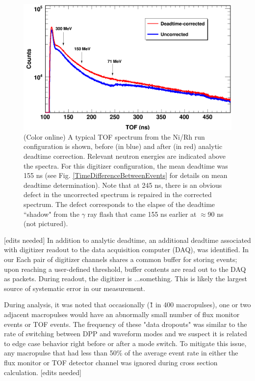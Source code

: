 \documentclass[twocolumn,secnumarabic,amssymb, nobibnotes, aps, prl,
superscriptaddress, nobalancelastpage]{revtex4}
\begin{document}
\begin{figure}
    \includegraphics[scale=0.3]{figures/CorrectionEffectOnTOF.png}
    \caption{(Color online) A typical TOF spectrum from the Ni/Rh
        run configuration is shown, before (in blue) and after (in red) analytic
        deadtime correction. Relevant neutron energies are indicated above the spectra.
        For this digitizer configuration, the mean deadtime was 155 ns (see Fig.
        \ref{TimeDifferenceBetweenEvents} for details on mean deadtime determination).
        Note that at 245 ns, there is an
        obvious defect in the uncorrected spectrum is repaired in the corrected
        spectrum. The defect
        corresponds to the elapse of the deadtime ``shadow" from the $\gamma$
        ray flash that came 155 ns earlier at $\approx$90 ns (not pictured).
    }
    \label{CorrectionEffectOnTOF}
\end{figure}

[edits needed]
In addition to analytic deadtime, an additional deadtime associated with digitizer readout 
to the data acquisition computer (DAQ), was identified. In our Each pair of
digitizer channels shares a common buffer for storing events; upon reaching a
user-defined threshold, buffer contents are read out to the DAQ as packets.
During readout, the digitizer is ...something.
This is likely the largest source of systematic error in our measurement.

During analysis, it was noted that occasionally (\~1 in 400 macropulses), one or two 
adjacent macropulses would have an abnormally small number of flux monitor events or 
TOF events. The frequency of these "data dropouts" was similar to the rate of
switching between DPP and waveform modes and we suspect it is related to edge
case behavior right before or after a mode switch. To mitigate this issue,
any macropulse that had less than 50\% of the average event rate in either the
flux monitor or TOF detector channel was ignored during cross section calculation.
[edits needed]
\end{document}
